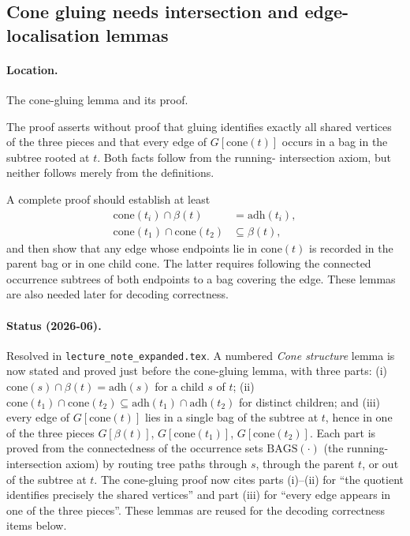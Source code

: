 \documentclass[11pt]{article}
\newcommand{\Bags}{\ensuremath{\mathrm{BAGS}}}
\newcommand{\adh}{\ensuremath{\mathrm{adh}}}
\newcommand{\cone}{\ensuremath{\mathrm{cone}}}
\begin{document}
\subsection{Cone gluing needs intersection and edge-localisation lemmas}

\paragraph{Location.} The cone-gluing lemma and its proof.

The proof asserts without proof that gluing identifies exactly all shared
vertices of the three pieces and that every edge of \(G[\cone(t)]\) occurs in a
bag in the subtree rooted at \(t\).  Both facts follow from the running-
intersection axiom, but neither follows merely from the definitions.

A complete proof should establish at least
\[
\begin{aligned}
  \cone(t_i)\cap\beta(t)&=\adh(t_i),\\
  \cone(t_1)\cap\cone(t_2)&\subseteq\beta(t),
\end{aligned}
\]
and then show that any edge whose endpoints lie in \(\cone(t)\) is recorded in
the parent bag or in one child cone.  The latter requires following the
connected occurrence subtrees of both endpoints to a bag covering the edge.
These lemmas are also needed later for decoding correctness.

\paragraph{Status (2026-06).} Resolved in \texttt{lecture\_note\_expanded.tex}.
A numbered \emph{Cone structure} lemma is now stated and proved just before the
cone-gluing lemma, with three parts: (i) \(\cone(s)\cap\beta(t)=\adh(s)\) for a
child \(s\) of \(t\); (ii) \(\cone(t_1)\cap\cone(t_2)\subseteq\adh(t_1)\cap\adh(t_2)\)
for distinct children; and (iii) every edge of \(G[\cone(t)]\) lies in a single bag
of the subtree at \(t\), hence in one of the three pieces \(G[\beta(t)]\),
\(G[\cone(t_1)]\), \(G[\cone(t_2)]\).  Each part is proved from the connectedness
of the occurrence sets \(\Bags(\cdot)\) (the running-intersection axiom) by routing
tree paths through \(s\), through the parent \(t\), or out of the subtree at \(t\).
The cone-gluing proof now cites parts (i)--(ii) for ``the quotient identifies
precisely the shared vertices'' and part (iii) for ``every edge appears in one of
the three pieces''.  These lemmas are reused for the decoding correctness items
below.
\end{document}
